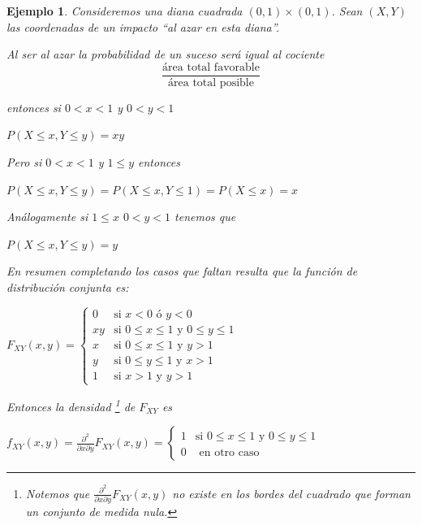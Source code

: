\documentclass[12pt]{report}
\newtheorem{example}[definition]{Ejemplo}
\begin{document}
     \begin{example}
                  Consideremos una diana cuadrada $(0,1)\times (0,1)$.
                  Sean $(X,Y)$ las coordenadas de un impacto ``al azar
                  en esta diana''.
                  
                  Al ser al azar la probabilidad de un suceso
                  será igual al cociente
                  $$
                  \frac{\mbox{área total favorable}}{\mbox{área
                  total posible}}$$
                  
                  entonces si $0<x<1$ y $0<y<1$

                  $P(X\leq x , Y\leq y)=xy$

                  Pero si $0<x<1$ y $1\leq y$ entonces

                  $P(X\leq x, Y\leq y)=P(X\leq x , Y\leq 1)=P(X\leq x)=x$

                  Análogamente si $1\leq x$ $0<y<1$ tenemos que

                  $P(X\leq x,Y\leq y)=y$

                  En resumen completando los casos que faltan resulta que la
                  función de distribución conjunta es:

                  $F_{XY}(x,y)=\left\{
                     \begin{array}{ll}
                      0 & \mbox{si } x<0 \mbox{ ó } y<0  \\
                     xy & \mbox{si } 0\leq x\leq 1 \mbox{ y } 0\leq y\leq 1   \\
                      x & \mbox{si } 0\leq x\leq 1 \mbox{ y } y>1\\
                      y & \mbox{si } 0\leq y\leq 1 \mbox{ y } x>1  \\
                      1 & \mbox{si } x>1 \mbox{ y } y>1
                  \end{array}
             \right.$


         Entonces la densidad
                     \footnote{ Notemos que
                 $\frac{\partial^2}{\partial x \partial y} F_{XY}(x,y)$ no existe
                 en los bordes del cuadrado que forman un conjunto de
                 medida nula.} de $F_{XY}$ es

        $f_{XY}(x,y)=$\newline$\frac{\partial^2}{\partial x \partial y} F_{XY}(x,y)=
        \left\{
                                        \begin{array}{ll}
                      1 & \mbox{si } 0\leq x\leq 1 \mbox{ y } 0\leq y\leq 1  \\
                     0 & \mbox{ en otro caso}
                 \end{array}\right.$


\end{example}
\end{document}
